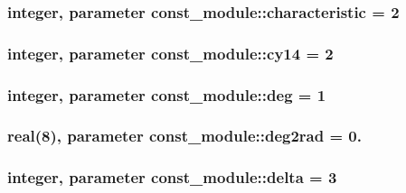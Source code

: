 \subsubsection[{characteristic}]{\setlength{\rightskip}{0pt plus 5cm}integer, parameter const\+\_\+module\+::characteristic = 2}\label{namespaceconst__module_ab9dc6742ce1e2309dd194ecdd254779d}
\hypertarget{namespaceconst__module_ac32c40069d129a7d06c22292afaae3ba}{}
\subsubsection[{cy14}]{\setlength{\rightskip}{0pt plus 5cm}integer, parameter const\+\_\+module\+::cy14 = 2}\label{namespaceconst__module_ac32c40069d129a7d06c22292afaae3ba}
\hypertarget{namespaceconst__module_ad7dece49d5a2db833c491ea2eed54f52}{}
\subsubsection[{deg}]{\setlength{\rightskip}{0pt plus 5cm}integer, parameter const\+\_\+module\+::deg = 1}\label{namespaceconst__module_ad7dece49d5a2db833c491ea2eed54f52}
\hypertarget{namespaceconst__module_a87cf12ab3afb0ddc5f58492d1fb1d828}{}
\subsubsection[{deg2rad}]{\setlength{\rightskip}{0pt plus 5cm}real(8), parameter const\+\_\+module\+::deg2rad = 0.}\label{namespaceconst__module_a87cf12ab3afb0ddc5f58492d1fb1d828}
\hypertarget{namespaceconst__module_a6bed9e9fc42a9b205a9214865ad145f5}{}
\subsubsection[{delta}]{\setlength{\rightskip}{0pt plus 5cm}integer, parameter const\+\_\+module\+::delta = 3}\label{namespaceconst__module_a6bed9e9fc42a9b205a9214865ad145f5}
\hypertarget{namespaceconst__module_ab766035166a55b031df25669f66e7b06}{}
